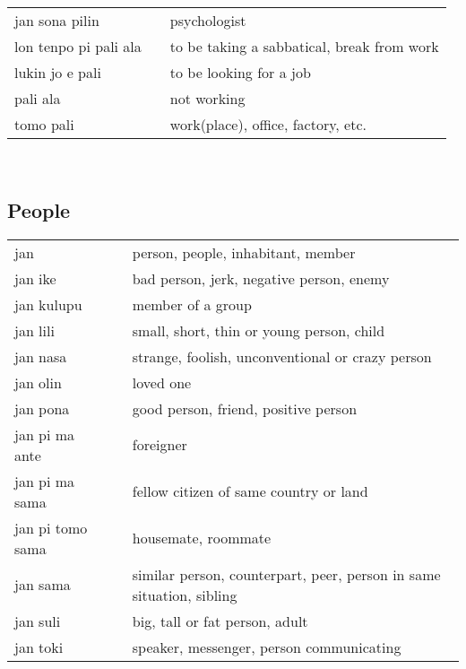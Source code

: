 \begin{supertabular}{p{4,5cm}|ll}
    jan sona pilin        &  & psychologist                                                             \\
    lon tenpo pi pali ala &  & to be taking a sabbatical, break from work                               \\
    lukin jo e pali       &  & to be looking for a job                                                  \\
    pali ala              &  & not working                                                              \\
    tomo pali             &  & work(place), office, factory, etc.                                       \\
\end{supertabular} \\
%
%
\subsection{People}
%
\begin{supertabular}{p{4,5cm}|ll}
    jan              &  & person, people, inhabitant, member                                   \\
    jan ike          &  & bad person, jerk, negative person, enemy                             \\
    jan kulupu       &  & member of a group                                                    \\
    jan lili         &  & small, short, thin or young person, child                            \\
    jan nasa         &  & strange, foolish, unconventional or crazy person                     \\
    jan olin         &  & loved one                                                            \\
    jan pona         &  & good person, friend, positive person                                 \\
    jan pi ma ante   &  & foreigner                                                            \\
    jan pi ma sama   &  & fellow citizen of same country or land                               \\
    jan pi tomo sama &  & housemate, roommate                                                  \\
    jan sama         &  & similar person, counterpart, peer, person in same situation, sibling \\
    jan suli         &  & big, tall or fat person, adult                                       \\
    jan toki         &  & speaker, messenger, person communicating                             \\
\end{supertabular} \\
%
%
